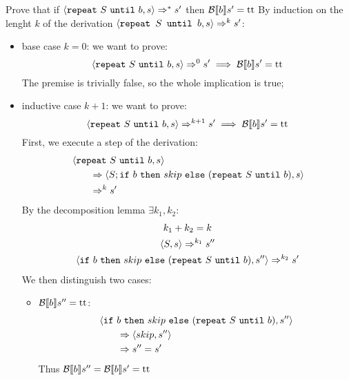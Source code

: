\begin{exercise}{
    Prove that if $\left<\texttt{repeat}\ S\ \texttt{until}\ b, s\right> \Rightarrow^* s'$ then $\mathcal{B} \llbracket b \rrbracket s' = \text{tt}$
}
    By induction on the lenght $k$ of the derivation $\left<\texttt{repeat } S \texttt{ until } b, s\right> \Rightarrow^k s'$:
    \begin{itemize}
        \item base case $k=0$: we want to prove:
            \[ \instr{\texttt{repeat}\ S\ \texttt{until}\ b}{s} \Rightarrow^0 s' \implies \Bool{b} s' = \text{tt} \]
            The premise is trivially false, so the whole implication is true;
        \item inductive case $k+1$: we want to prove:
            \[ \instr{\texttt{repeat}\ S\ \texttt{until}\ b}{s} \Rightarrow^{k+1} s' \implies \Bool{b} s' = \text{tt} \]
            First, we execute a step of the derivation:
            \begin{align*}
                &\instr{\texttt{repeat}\ S\ \texttt{until}\ b}{s}
                \\&\qquad \Rightarrow \instr{S; \texttt{if}\ b\ \texttt{then}\ skip\ \texttt{else}\ (\texttt{repeat}\ S\ \texttt{until}\ b)}{s}
                \\&\qquad \Rightarrow^k s'
            \end{align*}
            By the decomposition lemma $\exists k_1, k_2 :$
            \begin{gather*}
                k_1 + k_2 = k \\
                \instr{S}{s} \Rightarrow^{k_1} s'' \\
                \instr{\texttt{if}\ b\ \texttt{then}\ skip\ \texttt{else}\ (\texttt{repeat}\ S\ \texttt{until}\ b)}{s''} \Rightarrow^{k_2} s'
            \end{gather*}
            We then distinguish two cases:
            \begin{itemize}
                \item $\mathcal{B} \llbracket b \rrbracket s'' = \text{tt}$:
                    \begin{align*}
                        &\instr{\texttt{if}\ b\ \texttt{then}\ skip\ \texttt{else}\ (\texttt{repeat}\ S\ \texttt{until}\ b)}{s''}
                        \\&\qquad \Rightarrow \instr{skip}{s''}
                        \\&\qquad \Rightarrow s'' = s'
                    \end{align*}
                    Thus $\mathcal{B} \llbracket  b \rrbracket s'' = \mathcal{B} \llbracket  b \rrbracket s' = \text{tt}$

\end{itemize}
\end{itemize}
\end{exercise}
